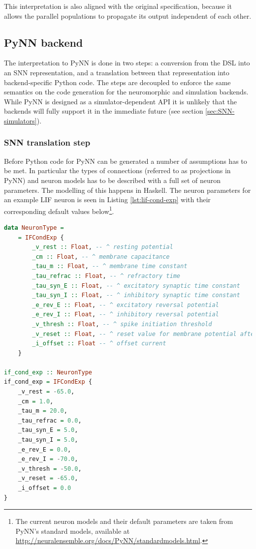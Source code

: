This interpretation is also aligned with the original specification, 
because it allows the parallel populations to propagate its output
independent of each other.

\subsection{PyNN backend}
The interpretation to PyNN is done in two steps: a
conversion from the \gls{DSL} into an \gls{SNN} representation,
and a translation between that representation into backend-specific
Python code.
The steps are decoupled to enforce the same semantics on the code
generation for the neuromorphic and simulation backends.
While PyNN is designed as a simulator-dependent \gls{API} 
it is unlikely that the backends will fully support it in the
immediate future (see section \ref{sec:SNN-simulators}).

\subsubsection{\gls{SNN} translation step}
Before Python code for PyNN can be generated a number of assumptions
has to be met. 
In particular the types of connections (referred to as projections in PyNN)
and neuron models has to be described with a full set of neuron parameters.
The modelling of this happens in Haskell.
The neuron parameters for an example LIF neuron is seen in Listing
\ref{lst:lif-cond-exp} with their corresponding default values
below\footnote{
The current neuron models and their default parameters are taken from PyNN's
standard models, available at
\url{http://neuralensemble.org/docs/PyNN/standardmodels.html}.
}.

\begin{lstlisting}[language=Haskell,caption={A LIF neuron with exponential decay and
  conductance-based synapses, modelled in Haskell.},label={lst:lif-cond-exp}]
data NeuronType =
    = IFCondExp {
        _v_rest :: Float, -- ^ resting potential
        _cm :: Float, -- ^ membrane capacitance
        _tau_m :: Float, -- ^ membrane time constant
        _tau_refrac :: Float, -- ^ refractory time
        _tau_syn_E :: Float, -- ^ excitatory synaptic time constant
        _tau_syn_I :: Float, -- ^ inhibitory synaptic time constant
        _e_rev_E :: Float, -- ^ excitatory reversal potential
        _e_rev_I :: Float, -- ^ inhibitory reversal potential
        _v_thresh :: Float, -- ^ spike initiation threshold
        _v_reset :: Float, -- ^ reset value for membrane potential after a spike
        _i_offset :: Float -- ^ offset current
    }

if_cond_exp :: NeuronType
if_cond_exp = IFCondExp {
    _v_rest = -65.0,
    _cm = 1.0,
    _tau_m = 20.0,
    _tau_refrac = 0.0,
    _tau_syn_E = 5.0,
    _tau_syn_I = 5.0,
    _e_rev_E = 0.0,
    _e_rev_I = -70.0,
    _v_thresh = -50.0,
    _v_reset = -65.0,
    _i_offset = 0.0
}
\end{lstlisting}

